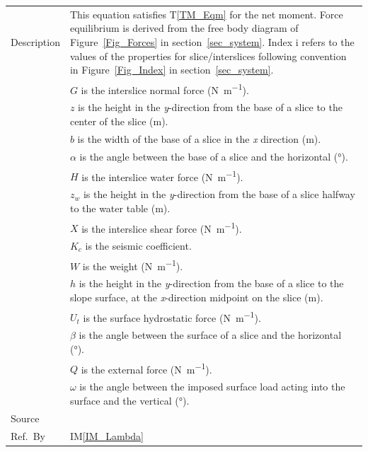 \documentclass[12pt]{article}
\newcommand{\colAwidth}{0.13\textwidth}
\newcommand{\colBwidth}{0.82\textwidth}
\newcommand{\tref}[1]{T\ref{#1}}
\newcommand{\iref}[1]{IM\ref{#1}}
\begin{document}
\begin{minipage}{\textwidth}
\begin{tabular}{| p{\colAwidth} | p{\colBwidth}|}
 \hline Description & This equation satisfies \tref{TM_Eqm} for the net moment. 
 Force equilibrium is derived from the free body diagram of 
 Figure~\ref{Fig_Forces} in section~\ref{sec_system}. Index $\text{i}$ refers 
 to the values of the properties for slice/interslices following convention in
 Figure~\ref{Fig_Index} in section~\ref{sec_system}.\\
 &$G$ is the interslice normal force (\si{\newton\per\meter}). \\
 &$z$ is the height in the \textit{y}-direction from the base of a slice 
 to the center of the slice (\si{\meter}).\\
 &$b$ is the width of the base of a slice in the \textit{x} direction 
 (\si{\meter}).\\
 &$\alpha$ is the angle between the base of a slice and the 
 horizontal (\si{\degree}). \\
 &$H$ is the interslice water force (\si{\newton\per\meter}). \\
 &$z_w$ is the height in the \textit{y}-direction from the base of a slice 
 halfway to the water table (\si{\meter}).\\
 &$X$ is the interslice shear force (\si{\newton\per\meter}). \\
 &$K_c$ is the seismic coefficient. \\
 &$W$ is the weight (\si{\newton\per\meter}). \\
 &$h$ is the height in the \textit{y}-direction from the base of a slice 
 to the slope surface, at the \textit{x}-direction midpoint on the slice 
 (\si{\meter}).\\
 &$U_t$ is the surface hydrostatic force (\si{\newton\per\meter}). \\
 &$\beta$ is the angle between the surface of a slice and the 
 horizontal (\si{\degree}). \\
 &$Q$ is the external force (\si{\newton\per\meter}). \\
 &$\omega$ is the angle between the imposed surface load acting into 
 the surface and the vertical (\si{\degree}). \\

  \hline Source & \cite{ZhuEtAl2005}\\
  
  \hline Ref.\ By & \iref{IM_Lambda}\\
  
  \hline
\end{tabular}
\end{minipage}\\
\end{document}
